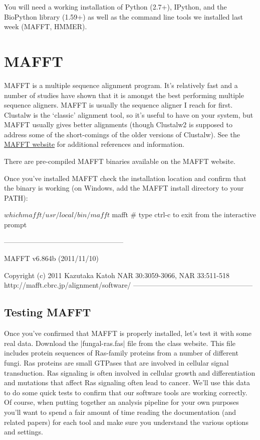 You will need a working installation of Python (2.7+), IPython, and the BioPython library (1.59+) as well as the command line tools we installed last week (MAFFT, HMMER).

\section{MAFFT}

MAFFT is a multiple sequence alignment program. It's relatively fast and a number of studies have shown that it is amongst the best performing multiple sequence aligners. MAFFT is usually the sequence aligner I reach for first.  Clustalw is the `classic' alignment tool, so it's useful to have on your system, but MAFFT usually gives better alignments (though Clustalw2 is supposed to address some of the short-comings of the older versions of Clustalw). See the \href{http://mafft.cbrc.jp/alignment/software/}{MAFFT website} for additional references and information.

There are pre-compiled MAFFT binaries available on the MAFFT website.

Once you've installed MAFFT check the installation location and confirm that the binary is working (on Windows, add the MAFFT install directory to your PATH):
%
\begin{code}
$ which mafft
/usr/local/bin/mafft
$ mafft  # type ctrl-c to exit from the interactive prompt

---------------------------------------------------

   MAFFT v6.864b (2011/11/10)

        Copyright (c) 2011 Kazutaka Katoh
        NAR 30:3059-3066, NAR 33:511-518
        http://mafft.cbrc.jp/alignment/software/
---------------------------------------------------
\end{code}

\subsection{Testing MAFFT}

Once you've confirmed that MAFFT is properly installed, let's test it with some real data. Download the |fungal-ras.fas| file from the class website. This file includes protein sequences of Ras-family proteins from a number of different fungi.  Ras proteins are small GTPases that are involved in cellular signal transduction.  Ras signaling is often involved in cellular growth and differentiation and mutations that affect Ras signaling often lead to cancer.  We'll use this data to do some quick tests to confirm that our software tools are working correctly. Of course, when putting together an analysis pipeline for your own purposes you'll want to spend a fair amount of time reading the documentation (and related papers) for each tool and make sure you understand the various options and settings.

